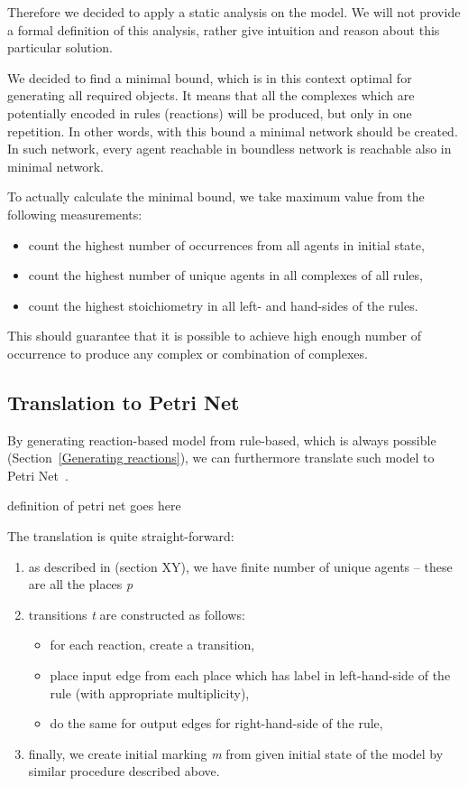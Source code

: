 \documentclass[12pt]{fithesis2}
\begin{document}
Therefore we decided to apply a static analysis on the model. We will not provide a formal definition of this analysis, rather give intuition and reason about this particular solution.

We decided to find a minimal bound, which is in this context optimal for generating all required objects. It means that all the complexes which are potentially encoded in rules (reactions) will be produced, but only in one repetition. In other words, with this bound a minimal network should be created. In such network, every agent reachable in boundless network is reachable also in minimal network.

To actually calculate the minimal bound, we take maximum value from the following measurements:

\begin{itemize}
  \item count the highest number of occurrences from all agents in initial state,
  \item count the highest number of unique agents in all complexes of all rules,
  \item count the highest stoichiometry in all left- and hand-sides of the rules.
\end{itemize}

This should guarantee that it is possible to achieve high enough number of occurrence to produce any complex or combination of complexes.

\subsection{Translation to Petri Net}

By generating reaction-based model from rule-based, which is always possible (Section~\ref{Generating reactions}), we can furthermore translate such model to Petri Net~\cite{petri}.

definition of petri net goes here

The translation is quite straight-forward: 

\begin{enumerate}
\item as described in (section XY), we have finite number of unique agents -- these are all the places \emph{p}
\item transitions \emph{t} are constructed as follows:
\begin{itemize}
  \item for each reaction, create a transition,
  \item place input edge from each place which has label in left-hand-side of the rule (with appropriate multiplicity),
  \item do the same for output edges for right-hand-side of the rule,
\end{itemize}
\item finally, we create initial marking \emph{m} from given initial state of the model by similar procedure described above.
\end{enumerate}
\end{document}
